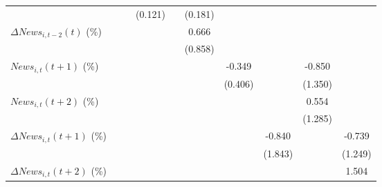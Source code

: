 {\begin{tabular}{l*{9}{c}}
                    &                     &                     &     (0.121)         &                     &     (0.181)         &                     &                     &                     &                     \\
\addlinespace
$ \Delta News_{i,t-2}(t)$ (\%)&                     &                     &                     &                     &       0.666         &                     &                     &                     &                     \\
                    &                     &                     &                     &                     &     (0.858)         &                     &                     &                     &                     \\
\addlinespace
$ News_{i,t}(t+1)$ (\%)&                     &                     &                     &                     &                     &      -0.349         &                     &      -0.850         &                     \\
                    &                     &                     &                     &                     &                     &     (0.406)         &                     &     (1.350)         &                     \\
\addlinespace
$ News_{i,t}(t+2)$ (\%)&                     &                     &                     &                     &                     &                     &                     &       0.554         &                     \\
                    &                     &                     &                     &                     &                     &                     &                     &     (1.285)         &                     \\
\addlinespace
$ \Delta News_{i,t}(t+1)$ (\%)&                     &                     &                     &                     &                     &                     &      -0.840         &                     &      -0.739         \\
                    &                     &                     &                     &                     &                     &                     &     (1.843)         &                     &     (1.249)         \\
\addlinespace
$ \Delta News_{i,t}(t+2)$ (\%)&                     &                     &                     &                     &                     &                     &                     &                     &       1.504         \\

\end{tabular}}
